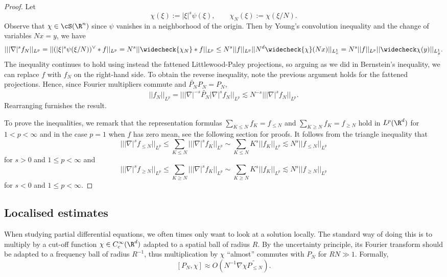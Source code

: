 \begin{proof}
	Let 
		\[ \chi (\xi) := |\xi|^s \psi (\xi), \qquad \chi_N (\xi) := \chi (\xi/N). \]
	Observe that $\chi \in \cS (\R^n)$ since $\psi$ vanishes in a neighborhood of the origin. Then by Young's convolution inequality and the change of variables $Nx = y$, we have
		\[ || |\nabla|^s f_N||_{L^p} = || ({|\xi|^s \psi (\xi/N)})^{\vee} * f ||_{L^p} = N^s ||\widecheck{\chi_N} * f||_{L^p} \leq N^s ||f||_{L^p} ||N^d \widecheck{\chi} (N x)||_{L^1_x} = N^s ||f||_{L^p} ||\widecheck \chi(y)||_{L^1_y}. \]	
	The inequality continues to hold using instead the fattened Littlewood-Paley projections, so arguing as we did in Bernstein's inequality, we can replace $f$ with $f_N$ on the right-hand side. To obtain the reverse inequality, note the previous argument holds for the fattened projections. Hence, since Fourier multipliers commute and $\widetilde{P_N} P_N = P_N$,
		\[ ||f_N||_{L^p} = || |\nabla|^{-s} \widetilde{P_N} |\nabla|^s f_N||_{L^p} \lesssim N^{-s} || |\nabla|^s f_N||_{L^p}.  \]
	Rearranging furnishes the result. 	

	To prove the inequalities, we remark that the representation formulas $\sum_{K \leq N} f_K = f_{\leq N}$ and $\sum_{K \geq N} f_K = f_{\geq N}$ hold in $L^p (\R^d)$ for $1 < p < \infty$ and in the case $p = 1$ when $f$ has zero mean, see the following section for proofs. It follows from the triangle inequality that
		\[	|| |\nabla|^s f_{\leq N} ||_{L^p} \leq \sum_{K \leq N} || | \nabla|^s f_K||_{L^p} \sim \sum_{K \leq N} K^s ||f_K||_{L^p} \lesssim N^s ||f_{\leq N} ||_{L^p}\]
	for $s > 0$ and $1 \leq p < \infty$ and
		\[	|| |\nabla|^s f_{\geq N} ||_{L^p} \leq \sum_{K \geq N} || | \nabla|^s f_K||_{L^p} \sim \sum_{K \geq N} K^s ||f_K||_{L^p} \lesssim N^s ||f_{\geq N} ||_{L^p}\]
	for $s < 0$ and $1 \leq p < \infty$. 
\end{proof}


\subsection{Localised estimates}

When studying partial differential equations, we often times only want to look at a solution locally.  The standard way of doing this is to multiply by a cut-off function $\chi \in C^\infty_c (\R^d)$ adapted to a spatial ball of radius $R$. By the uncertainty principle, its Fourier transform should be adapted to a frequency ball of radius $R^{-1}$, thus multiplication by $\chi$ ``almost'' commutes with $P_N$ for $RN \gg 1$. Formally, 
	\[ [P_N, \chi] \approx O (N^{-1} \nabla \chi \widetilde{P_{\leq N}}).  \]

